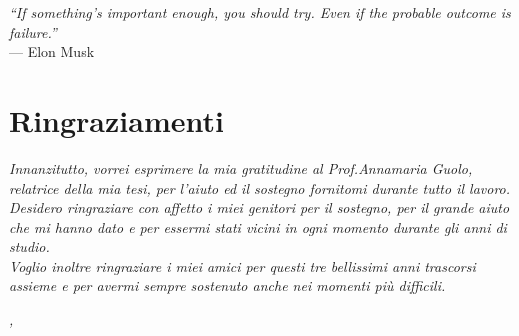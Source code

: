 
\cleardoublepage
{}
{}

\begin{flushright}{
	\slshape    
	``If something's important enough, you should try. Even if the probable outcome is failure.''} \\ 
	\medskip
   	--- Elon Musk %
\end{flushright}


\bigskip

\begingroup
\let\clearpage\relax
\let\cleardoublepage\relax
\let\cleardoublepage\relax

\chapter*{Ringraziamenti}

\noindent \textit{Innanzitutto, vorrei esprimere la mia gratitudine al Prof.Annamaria Guolo, relatrice della mia tesi, per l'aiuto ed il sostegno fornitomi durante tutto il lavoro.}\\

\noindent \textit{Desidero ringraziare con affetto i miei genitori per il sostegno, per il grande aiuto che mi hanno dato e per essermi stati vicini in ogni momento durante gli anni di studio.}\\

\noindent \textit{Voglio inoltre ringraziare i miei amici per questi tre bellissimi anni trascorsi assieme e per avermi sempre sostenuto anche nei momenti più difficili.}\\

\bigskip

\noindent\textit{\myLocation, \myTime}
\hfill \myName

\endgroup


